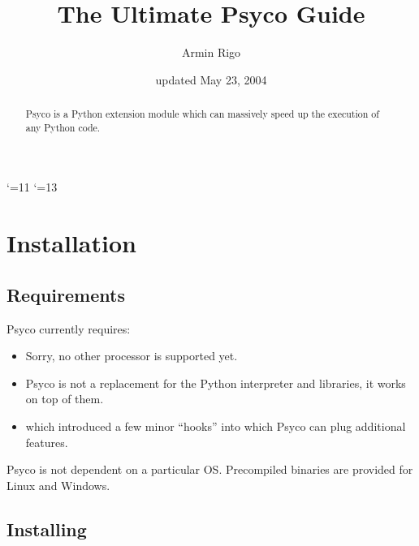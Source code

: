 \documentclass{manual}
\title{The Ultimate Psyco Guide}
\author{Armin Rigo}
\date{updated May 23, 2004}
\begin{document}
\catcode`\@=11
\renewcommand{\py@reset}{}
\catcode`\@=13

\maketitle


\begin{abstract}

\noindent
Psyco is a Python extension module which can massively speed up the execution of any Python code.


\end{abstract}

\tableofcontents


\chapter{Installation}

\section{Requirements}\label{req}

Psyco currently requires:

\begin{itemize}
  
\item {}  Sorry, no other processor is supported yet.
  
\item {}  Psyco is not a replacement for the Python interpreter and libraries, it works on top of them.
  
\item {} which introduced a few minor ``hooks'' into which Psyco can plug additional features.
  
\end{itemize}

Psyco is not dependent on a particular OS.  Precompiled binaries are provided for Linux and Windows.


\section{Installing}\label{binaries}
\end{document}
